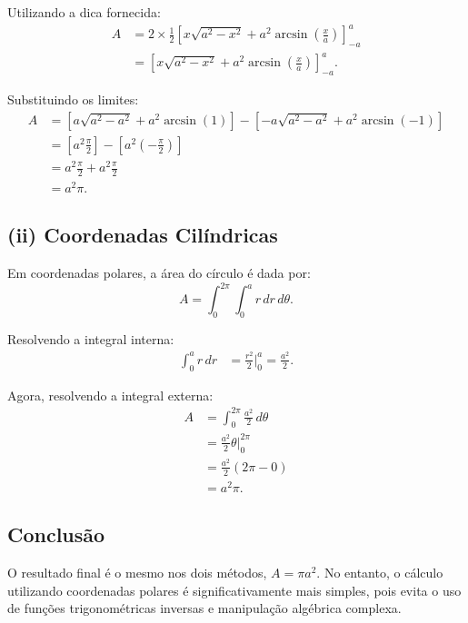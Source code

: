 \documentclass[a4paper,12pt]{article}
\begin{document}
Utilizando a dica fornecida:
\begin{align*}
A &= 2 \times \frac{1}{2} \left[ x\sqrt{a^2 - x^2} + a^2 \arcsin\left(\frac{x}{a}\right) \right]_{-a}^{a} \\
&= \left[ x\sqrt{a^2 - x^2} + a^2 \arcsin\left(\frac{x}{a}\right) \right]_{-a}^{a}.
\end{align*}

Substituindo os limites:
\begin{align*}
A &= \left[a\sqrt{a^2 - a^2} + a^2 \arcsin(1) \right] - \left[-a\sqrt{a^2 - a^2} + a^2 \arcsin(-1) \right] \\
&= \left[a^2 \frac{\pi}{2} \right] - \left[a^2 \left(-\frac{\pi}{2}\right) \right] \\
&= a^2 \frac{\pi}{2} + a^2 \frac{\pi}{2} \\
&= a^2 \pi.
\end{align*}

\subsection*{(ii) Coordenadas Cilíndricas}
Em coordenadas polares, a área do círculo é dada por:
\begin{equation}
A = \int_0^{2\pi} \int_0^a r \, dr \, d\theta.
\end{equation}

Resolvendo a integral interna:
\begin{align*}
\int_0^a r \, dr &= \frac{r^2}{2} \Big|_0^a = \frac{a^2}{2}.
\end{align*}

Agora, resolvendo a integral externa:
\begin{align*}
A &= \int_0^{2\pi} \frac{a^2}{2} \, d\theta \\
&= \frac{a^2}{2} \theta \Big|_0^{2\pi} \\
&= \frac{a^2}{2} (2\pi - 0) \\
&= a^2 \pi.
\end{align*}

\subsection*{Conclusão}
O resultado final é o mesmo nos dois métodos, $A = \pi a^2$. No entanto, o cálculo utilizando 
coordenadas polares é significativamente mais simples, pois evita o uso de funções trigonométricas 
inversas e manipulação algébrica complexa.
    
\end{document}
